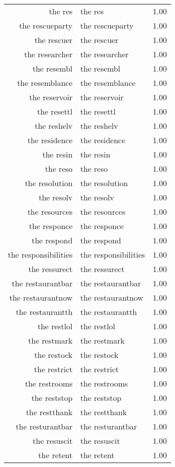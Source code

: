 \begin{table}[ht]
\begin{tabular}{rlr}
  the res & the res & 1.00 \\ 
  the rescueparty & the rescueparty & 1.00 \\ 
  the rescuer & the rescuer & 1.00 \\ 
  the researcher & the researcher & 1.00 \\ 
  the resembl & the resembl & 1.00 \\ 
  the resemblance & the resemblance & 1.00 \\ 
  the reservoir & the reservoir & 1.00 \\ 
  the resettl & the resettl & 1.00 \\ 
  the reshelv & the reshelv & 1.00 \\ 
  the residence & the residence & 1.00 \\ 
  the resin & the resin & 1.00 \\ 
  the reso & the reso & 1.00 \\ 
  the resolution & the resolution & 1.00 \\ 
  the resolv & the resolv & 1.00 \\ 
  the resources & the resources & 1.00 \\ 
  the responce & the responce & 1.00 \\ 
  the respond & the respond & 1.00 \\ 
  the responsibilities & the responsibilities & 1.00 \\ 
  the ressurect & the ressurect & 1.00 \\ 
  the restaurantbar & the restaurantbar & 1.00 \\ 
  the restaurantnow & the restaurantnow & 1.00 \\ 
  the restaurantth & the restaurantth & 1.00 \\ 
  the restlol & the restlol & 1.00 \\ 
  the restmark & the restmark & 1.00 \\ 
  the restock & the restock & 1.00 \\ 
  the restrict & the restrict & 1.00 \\ 
  the restrooms & the restrooms & 1.00 \\ 
  the reststop & the reststop & 1.00 \\ 
  the restthank & the restthank & 1.00 \\ 
  the resturantbar & the resturantbar & 1.00 \\ 
  the resuscit & the resuscit & 1.00 \\ 
  the retent & the retent & 1.00 \\ 

\end{tabular}
\end{table}
